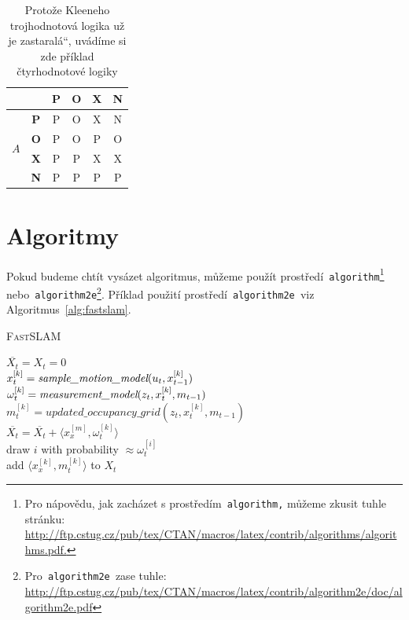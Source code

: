 \documentclass[a4paper, 11pt]{article}
\providecommand{\uv}[1]{\quotedblbase#1\textquotedblleft}
\begin{document}
\begin{table}[ht]
\begin{tabular}{|c|c|c|c|c|c|}
        \multicolumn{2}{|c|}{} & \textbf{P} & \textbf{O} & \textbf{X} & \textbf{N} \\
        \hline
        \multirow{4}{*}{$A$} & \textbf{P} & P & O & X & N \\
        \cline{2-6}
        & \textbf{O} & P & O & P & O \\
        \cline{2-6}
        & \textbf{X} & P & P & X & X \\
        \cline{2-6}
        & \textbf{N} & P & P & P & P \\
        \hline
    \end{tabular}
    \caption{Protože Kleeneho trojhodnotová logika už je \uv{zastaralá}, uvádíme si zde příklad čtyrhodnotové logiky}
    \label{tab:logic}
\end{table}
\bigskip
\pagebreak

\section{Algoritmy}\label{alg}

Pokud budeme chtít vysázet algoritmus, můžeme použít prostředí\verb| algorithm|\footnote{Pro nápovědu, jak zacházet s prostředím\texttt{ algorithm,} můžeme zkusit tuhle stránku:\\ \href{http://ftp.cstug.cz/pub/tex/CTAN/macros/latex/contrib/algorithms/algorithms.pdf.}{http://ftp.cstug.cz/pub/tex/CTAN/macros/latex/contrib/algorithms/algorithms.pdf.}}\verb| | nebo\verb| algorithm2e|\footnote{Pro\texttt{ algorithm2e }zase tuhle: \href{http://ftp.cstug.cz/pub/tex/CTAN/macros/latex/contrib/algorithm2e/doc/algorithm2e.pdf}{http://ftp.cstug.cz/pub/tex/CTAN/macros/latex/contrib/algorithm2e/doc/algorithm2e.pdf}}.
Příklad použití prostředí\verb| algorithm2e |viz Algoritmus~\ref{alg:fastslam}.
\bigskip

\begin{algorithm}[h]
    \label{alg:fastslam}
    \caption{\textsc{FastSLAM}}
    \SetNlSty{}{}{:}
    \SetNlSkip{-12pt}
    \SetAlgoNoLine
    \BlankLine
    \Indpp\Indp $\overline{X_t} = X_t = 0$ \\
     {\Indpp
        $x_t^{[k]} = \emph{sample\_motion\_model}(u_t, x_{t-1}^{[k]})$ \\
        $\omega_t^{[k]} = \emph{measurement\_model}(z_t, x_t^{[k]}, m_{t-1})$ \\
        $m_t^{[k]} = updated\_occupancy\_grid(z_t, x_t^{[k]}, m_{t-1})$ \\
        $\overline{X_t} = \overline{X_t} + \langle x_x^{[m]}, \omega_t^{[k]} \rangle$ \\
    }
     {\Indpp
        draw $i$ with probability $\approx \omega_t^{[i]}$ \\
        add $\langle x_x^{[k]}, m_t^{[k]} \rangle$ to $X_t$ \\
    }
\end{algorithm}
\end{document}
